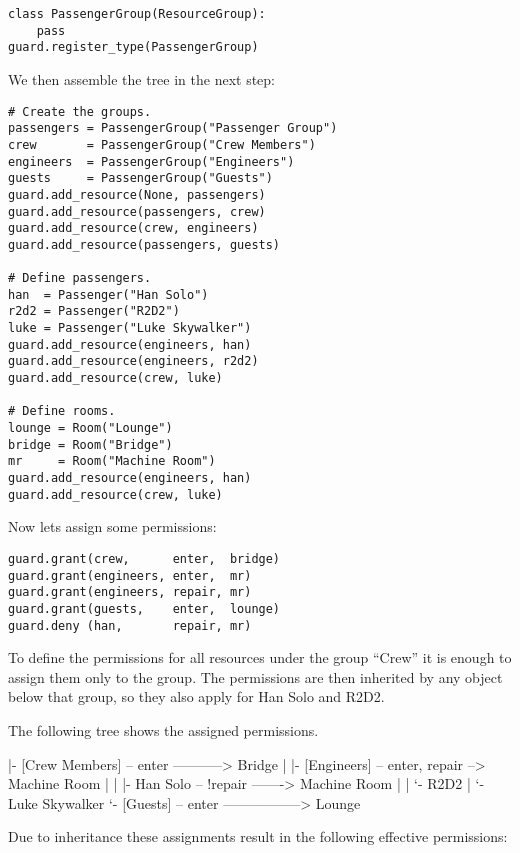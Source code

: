 \begin{lstlisting}
class PassengerGroup(ResourceGroup):
    pass
guard.register_type(PassengerGroup)
\end{lstlisting}

We then assemble the tree in the next step:

\begin{lstlisting}
# Create the groups.
passengers = PassengerGroup("Passenger Group")
crew       = PassengerGroup("Crew Members")
engineers  = PassengerGroup("Engineers")
guests     = PassengerGroup("Guests")
guard.add_resource(None, passengers)
guard.add_resource(passengers, crew)
guard.add_resource(crew, engineers)
guard.add_resource(passengers, guests)

# Define passengers.
han  = Passenger("Han Solo")
r2d2 = Passenger("R2D2")
luke = Passenger("Luke Skywalker")
guard.add_resource(engineers, han)
guard.add_resource(engineers, r2d2)
guard.add_resource(crew, luke)

# Define rooms.
lounge = Room("Lounge")
bridge = Room("Bridge")
mr     = Room("Machine Room")
guard.add_resource(engineers, han)
guard.add_resource(crew, luke)
\end{lstlisting}

Now lets assign some permissions:

\begin{lstlisting}
guard.grant(crew,      enter,  bridge)
guard.grant(engineers, enter,  mr)
guard.grant(engineers, repair, mr)
guard.grant(guests,    enter,  lounge)
guard.deny (han,       repair, mr)
\end{lstlisting}

To define the permissions for all resources under the group ``Crew'' it is 
enough to assign them only to the group. The permissions are then inherited 
by any object below that group, so they also apply for Han Solo and R2D2.

The following tree shows the assigned permissions.

\begin{indentverb}
[Passengers]
  |- [Crew Members] -- enter -----------> Bridge
  |   |- [Engineers] -- enter, repair --> Machine Room
  |   |   |- Han Solo -- !repair -------> Machine Room
  |   |   `- R2D2
  |   `- Luke Skywalker
  `- [Guests] -- enter -----------------> Lounge
\end{indentverb}

Due to inheritance these assignments result in the following effective 
permissions:

